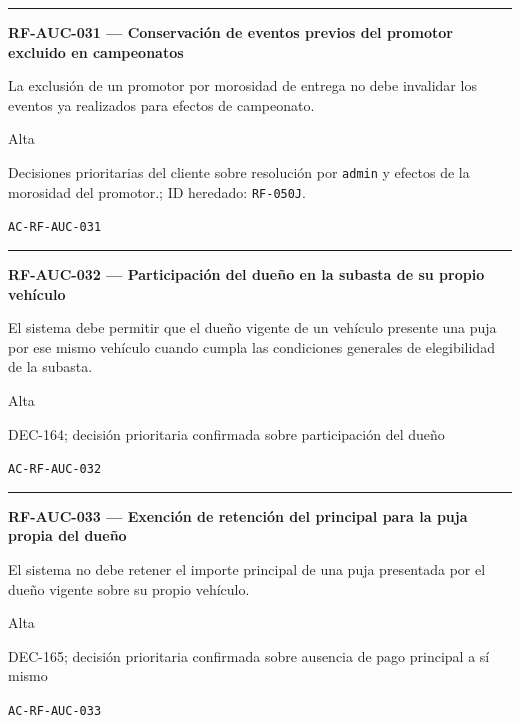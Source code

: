 \documentclass[10pt,letterpaper]{article}
\begin{document}
\vspace{0.25em}\hrule\vspace{0.65em}
\noindent\textbf{RF-AUC-031 --- Conservación de eventos previos del promotor excluido en campeonatos}\par
\begin{description}[style=nextline,leftmargin=3.15cm,labelwidth=2.8cm,font=\normalfont\bfseries]
\item[Obligación] La exclusión de un promotor por morosidad de entrega no debe invalidar los eventos ya realizados para efectos de campeonato.
\item[Prioridad] Alta
\item[Procedencia] Decisiones prioritarias del cliente sobre resolución por \texttt{admin} y efectos de la morosidad del promotor.; ID heredado: \texttt{RF-050J}.
\item[Verificación] \texttt{AC-RF-AUC-031}
\end{description}
\vspace{0.25em}\hrule\vspace{0.65em}
\noindent\textbf{RF-AUC-032 --- Participación del dueño en la subasta de su propio vehículo}\par
\begin{description}[style=nextline,leftmargin=3.15cm,labelwidth=2.8cm,font=\normalfont\bfseries]
\item[Obligación] El sistema debe permitir que el dueño vigente de un vehículo presente una puja por ese mismo vehículo cuando cumpla las condiciones generales de elegibilidad de la subasta.
\item[Prioridad] Alta
\item[Procedencia] DEC-164; decisión prioritaria confirmada sobre participación del dueño
\item[Verificación] \texttt{AC-RF-AUC-032}
\end{description}
\vspace{0.25em}\hrule\vspace{0.65em}
\noindent\textbf{RF-AUC-033 --- Exención de retención del principal para la puja propia del dueño}\par
\begin{description}[style=nextline,leftmargin=3.15cm,labelwidth=2.8cm,font=\normalfont\bfseries]
\item[Obligación] El sistema no debe retener el importe principal de una puja presentada por el dueño vigente sobre su propio vehículo.
\item[Prioridad] Alta
\item[Procedencia] DEC-165; decisión prioritaria confirmada sobre ausencia de pago principal a sí mismo
\item[Verificación] \texttt{AC-RF-AUC-033}
\end{description}
\end{document}
